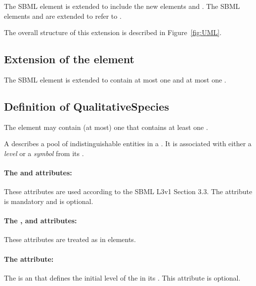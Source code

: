 The SBML element  is extended to include the new elements  and . The SBML elements  and  are extended to refer to .

The overall structure of this extension is described in Figure~\ref{fig:UML}.

\bigskip
\subsection*{Extension of the  element} %
\label{sub:model}
The SBML element  is extended to contain at most one  and at most one .

\subsection*{Definition of \textsf{\textbf{\hypertarget{QualitativeSpecies}{QualitativeSpecies}}}} %

The  element may contain (at most) one  that contains at least one .

A  describes a pool of indistinguishable entities in a . It is associated with either a \emph{level} or a \emph{symbol} from its .

\paragraph{The  and  attributes:}
These attributes are used according to the SBML L3v1 Section 3.3. The attribute  is mandatory and  is optional. 

\paragraph{The ,  and  attributes:}
These attributes are treated as in  elements.

\paragraph{The   attribute:}
The  is an  that defines the initial level of the  in its . This attribute is optional.

